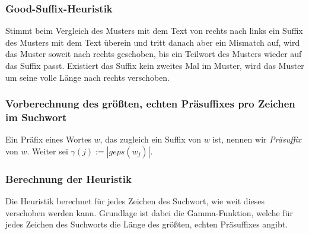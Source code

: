 \subsubsection{Good-Suffix-Heuristik}
Stimmt beim Vergleich des Musters mit dem Text von rechts nach links ein Suffix des Musters mit dem Text überein und tritt danach aber ein Mismatch auf, wird das Muster soweit nach rechts geschoben, bis ein Teilwort des Musters wieder auf das Suffix passt. Existiert das Suffix kein zweites Mal im Muster, wird das Muster um seine volle Länge nach rechts verschoben.

\subsubsection{Vorberechnung des größten, echten Präsuffixes pro Zeichen im Suchwort}
Ein Präfix eines Wortes \(w\), das zugleich ein Suffix von \(w\) ist, nennen wir \textit{Präsuffix} von \(w\). Weiter sei \(\gamma(j) := | geps(w_j)|\).
\text{}\\


\subsubsection{Berechnung der Heuristik}
Die Heuristik berechnet für jedes Zeichen des Suchwort, wie weit dieses verschoben werden kann. Grundlage ist dabei die Gamma-Funktion, welche für jedes Zeichen des Suchworts die Länge des größten, echten Präsuffixes angibt.
\text{}\\

